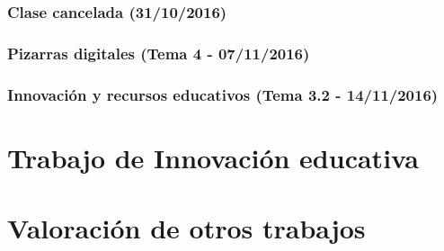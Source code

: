 \documentclass[palatino,nochap,miniheader]{apuntesURJC}
\begin{document}
\subsection{Clase cancelada (31/10/2016)}

\subsection{Pizarras digitales (Tema 4 - 07/11/2016)}
%

\subsection{Innovación y recursos educativos (Tema 3.2 - 14/11/2016)}




\chapter{Trabajo de Innovación educativa}



\chapter{Valoración de otros trabajos}








\printindex
\end{document}
